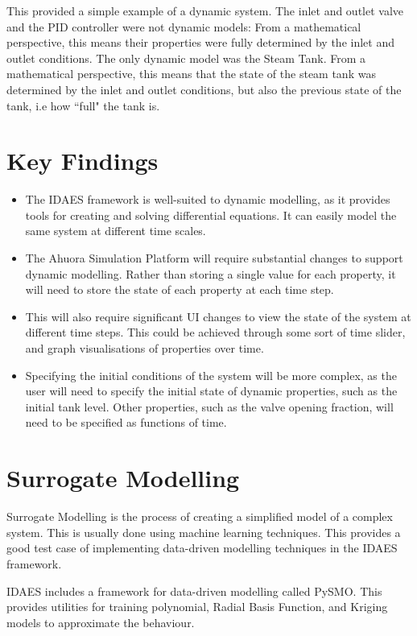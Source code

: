 \documentclass[12pt]{report}
\begin{document}
This provided a simple example of a dynamic system. The inlet and outlet valve and the PID controller were not dynamic models: From a mathematical perspective, this means their properties were fully determined by the inlet and outlet conditions. The only dynamic model was the Steam Tank. From a mathematical perspective, this means that the state of the steam tank was determined by the inlet and outlet conditions, but also the previous state of the tank, i.e how ``full" the tank is.


\section{Key Findings}

\begin{itemize}
    \item The IDAES framework is well-suited to dynamic modelling, as it provides tools for creating and solving differential equations. It can easily model the same system at different time scales.
    \item The Ahuora Simulation Platform will require substantial changes to support dynamic modelling. Rather than storing a single value for each property, it will need to store the state of each property at each time step.
    \item This will also require significant UI changes to view the state of the system at different time steps. This could be achieved through some sort of time slider, and graph visualisations of properties over time.
    \item Specifying the initial conditions of the system will be more complex, as the user will need to specify the initial state of dynamic properties, such as the initial tank level. Other properties, such as the valve opening fraction, will need to be specified as functions of time.
\end{itemize}

\section{Surrogate Modelling}

Surrogate Modelling is the process of creating a simplified model of a complex system. This is usually done using machine learning techniques. This provides a good test case of implementing data-driven modelling techniques in the IDAES framework.

IDAES includes a framework for data-driven modelling called PySMO. This provides utilities for training polynomial, Radial Basis Function, and Kriging models to approximate the behaviour.
\end{document}
